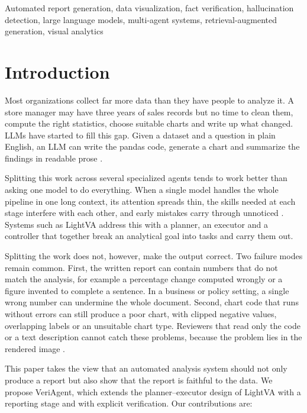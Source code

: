 \documentclass[conference]{IEEEtran}
\begin{document}
\begin{IEEEkeywords}
Automated report generation, data visualization, fact verification, hallucination detection, large language models, multi-agent systems, retrieval-augmented generation, visual analytics
\end{IEEEkeywords}

\section{Introduction}

Most organizations collect far more data than they have people to analyze it. A store manager may have three years of sales records but no time to clean them, compute the right statistics, choose suitable charts and write up what changed. LLMs have started to fill this gap. Given a dataset and a question in plain English, an LLM can write the pandas code, generate a chart and summarize the findings in readable prose \cite{sun2025survey,wang2025dssurvey}.

Splitting this work across several specialized agents tends to work better than asking one model to do everything. When a single model handles the whole pipeline in one long context, its attention spreads thin, the skills needed at each stage interfere with each other, and early mistakes carry through unnoticed \cite{montazeri2025publicagent}. Systems such as LightVA \cite{zhao2024lightva} address this with a planner, an executor and a controller that together break an analytical goal into tasks and carry them out.

Splitting the work does not, however, make the output correct. Two failure modes remain common. First, the written report can contain numbers that do not match the analysis, for example a percentage change computed wrongly or a figure invented to complete a sentence. In a business or policy setting, a single wrong number can undermine the whole document. Second, chart code that runs without errors can still produce a poor chart, with clipped negative values, overlapping labels or an unsuitable chart type. Reviewers that read only the code or a text description cannot catch these problems, because the problem lies in the rendered image \cite{pan2025visshepherd}.

This paper takes the view that an automated analysis system should not only produce a report but also show that the report is faithful to the data. We propose VeriAgent, which extends the planner--executor design of LightVA with a reporting stage and with explicit verification. Our contributions are:
\end{document}
